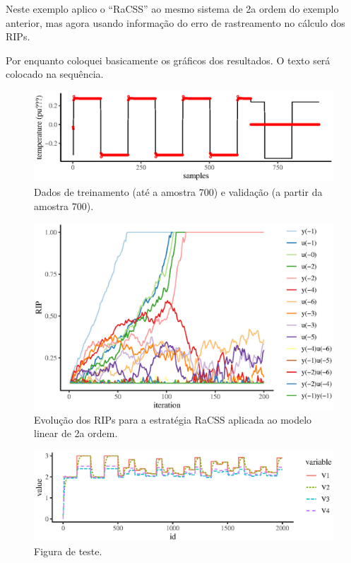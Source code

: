 \begin{exmp}

  Neste exemplo aplico o ``RaCSS'' ao mesmo sistema de 2a ordem do exemplo anterior, mas agora usando informação do erro de rastreamento no cálculo dos RIPs.

  Por enquanto coloquei basicamente os gráficos dos resultados. O texto será colocado na sequência.

  \begin{figure}[H]
    \centering
    \includegraphics{./Figs/s.motorcc.VRFT.racss_train_val_data.eps}
    \caption{Dados de treinamento (até a amostra 700) e validação (a partir da amostra 700).}\label{fig:RIPs2}
  \end{figure}

  \begin{figure}[H]
    \centering
    \includegraphics{./Figs/s.motorcc.VRFT.racss_RIPs.eps}
    \caption{Evolução dos RIPs para a estratégia RaCSS aplicada ao modelo linear de 2a ordem.}
    \label{fig:RIPs2}
  \end{figure}

  \begin{figure}[H]
    \centering
    \includegraphics{Figs/s.heater.var.dissip.VRFT_teste.eps}
    \caption{Figura de teste.}
    \label{fig:teste}
  \end{figure}


\end{exmp}
